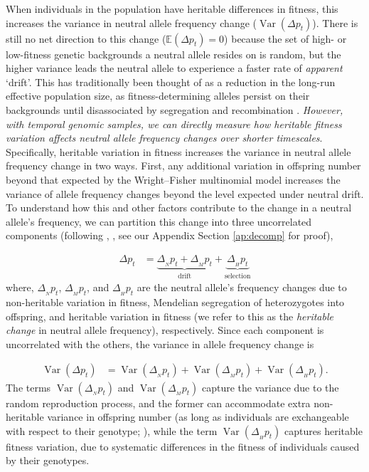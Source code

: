\documentclass[11pt]{article}
\newcommand{\vb}[1]{{\it \color{blue} #1}}
\newcommand{\E}{\mathbb{E}}
\DeclareMathOperator{\var}{Var}
\begin{document}
When individuals in the population have heritable differences in fitness, this
increases the variance in neutral allele frequency change ($\var(\Delta p_t)$).
There is still no net direction to this change ($\E(\Delta p_t) = 0$) because
the set of high- or low-fitness genetic backgrounds a neutral allele resides on
is random, but the higher variance leads the neutral allele to experience a
faster rate of \emph{apparent} `drift'. This has traditionally been thought of
as a reduction in the long-run effective population size, as
fitness-determining alleles persist on their backgrounds until disassociated by
segregation and recombination \parencite{Robertson1961-ho,
  Santiago1995-hx,Santiago1998-bs}. \vb{However, with temporal genomic samples,
we can directly measure how heritable fitness variation affects neutral allele
frequency changes over shorter timescales}. Specifically, heritable variation
in fitness increases the variance in neutral allele frequency change in two
ways. First, any additional variation in offspring number beyond that expected
by the Wright--Fisher multinomial model increases the variance of allele
frequency changes beyond the level expected under neutral drift. To understand
how this and other factors contribute to the change in a neutral allele's
frequency, we can partition this change into three uncorrelated components
(following \citeauthor{Santiago1995-hx}, \citeyear{Santiago1995-hx}, see our
Appendix Section \ref{ap:decomp} for proof),

\begin{align}
  \Delta p_t %
  &= \underbrace{\Delta_{_N} p_t + \Delta_{_M} p_t}_\text{drift} + \underbrace{\Delta_{_H} p_t}_\text{selection}
  \label{eq:delp-decomp}
\end{align}
%
where, $\Delta_{_N} p_t$, $\Delta_{_M} p_t$, and $\Delta_{_H} p_t$ are the
neutral allele's frequency changes due to non-heritable variation in fitness,
Mendelian segregation of heterozygotes into offspring, and heritable variation in
fitness (we refer to this as the \emph{heritable change} in neutral allele
frequency), respectively. Since each component is uncorrelated with the others,
the variance in allele frequency change is

\begin{align}
  \var(\Delta p_t) &= \var(\Delta_{_N} p_t)  + \var(\Delta_{_M} p_t) + \var(\Delta_{_H} p_t).
  \label{eq:var-decomp-1}
\end{align}
%
The terms $\var(\Delta_{_N} p_t)$ and $\var(\Delta_{_M} p_t)$ capture the
variance due to the random reproduction process, and the former can
accommodate extra non-heritable variance in offspring number (as long as
individuals are exchangeable with respect to their genotype;
\cite{Cannings1974-ps}), while the term $\var(\Delta_{_H} p_t)$ captures
heritable fitness variation, due to systematic differences in the fitness of
individuals caused by their genotypes.
\end{document}
